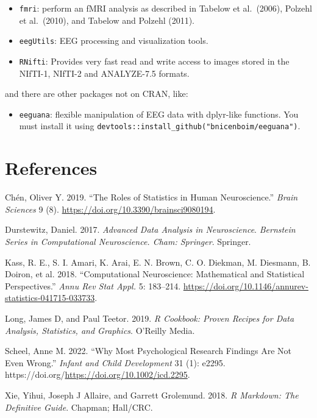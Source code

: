 \documentclass[
]{article}
\providecommand{\tightlist}{%
  \setlength{\itemsep}{0pt}\setlength{\parskip}{0pt}}
\newlength{\cslhangindent}
\newlength{\cslentryspacingunit} %
\newenvironment{CSLReferences}[2] %
 {%
  \setlength{\parindent}{0pt}
  \ifodd #1
  \let\oldpar\par
  \def\par{\hangindent=\cslhangindent\oldpar}
  \fi
  \setlength{\parskip}{#2\cslentryspacingunit}
 }%
 {}
\begin{document}
\begin{itemize}
\tightlist
\item
  \texttt{fmri}: perform an fMRI analysis as described in Tabelow et
  al.~(2006), Polzehl et al.~(2010), and Tabelow and Polzehl (2011).
\item
  \texttt{eegUtils}: EEG processing and visualization tools.
\item
  \texttt{RNifti}: Provides very fast read and write access to images
  stored in the NIfTI-1, NIfTI-2 and ANALYZE-7.5 formats.
\end{itemize}

and there are other packages not on CRAN, like:

\begin{itemize}
\tightlist
\item
  \texttt{eeguana}: flexible manipulation of EEG data with dplyr-like
  functions. You must install it using
  \texttt{devtools::install\_github("bnicenboim/eeguana")}.
\end{itemize}

\hypertarget{references}{%
\section*{References}\label{references}}

\hypertarget{refs}{}
\begin{CSLReferences}{1}{0}
\leavevmode{}%
Chén, Oliver Y. 2019. {``The Roles of Statistics in Human
Neuroscience.''} \emph{Brain Sciences} 9 (8).
\url{https://doi.org/10.3390/brainsci9080194}.

\leavevmode{}%
Durstewitz, Daniel. 2017. \emph{Advanced Data Analysis in Neuroscience}.
\emph{Bernstein Series in Computational Neuroscience. Cham: Springer}.
Springer.

\leavevmode{}%
Kass, R. E., S. I. Amari, K. Arai, E. N. Brown, C. O. Diekman, M.
Diesmann, B. Doiron, et al. 2018. {``Computational Neuroscience:
Mathematical and Statistical Perspectives.''} \emph{Annu Rev Stat Appl.}
5: 183--214.
\url{https://doi.org/10.1146/annurev-statistics-041715-033733}.

\leavevmode{}%
Long, James D, and Paul Teetor. 2019. \emph{R Cookbook: Proven Recipes
for Data Analysis, Statistics, and Graphics}. O'Reilly Media.

\leavevmode{}%
Scheel, Anne M. 2022. {``Why Most Psychological Research Findings Are
Not Even Wrong.''} \emph{Infant and Child Development} 31 (1): e2295.
https://doi.org/\url{https://doi.org/10.1002/icd.2295}.

\leavevmode{}%
Xie, Yihui, Joseph J Allaire, and Garrett Grolemund. 2018. \emph{R
Markdown: The Definitive Guide}. Chapman; Hall/CRC.

\end{CSLReferences}
\end{document}

